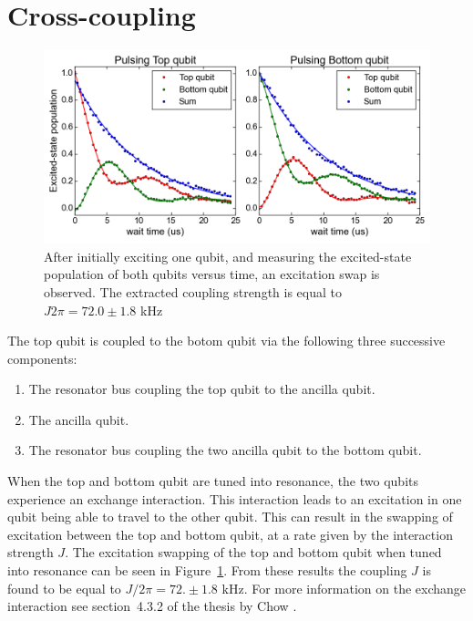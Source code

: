     \section{Cross-coupling}
      \label{sec:cross-coupling}
      \begin{figure}[tb]
        \centering
        \includegraphics[width=\linewidth]{../Figures/Exploring frequency re-use/excitation_swap.png}
        \caption{After initially exciting one qubit, and measuring the excited-state population of both qubits versus time, an excitation swap is observed. The extracted coupling strength is equal to $J2\pi=72.0 \pm 1.8$ kHz}
        \label{fig:excitation swap}
      \end{figure}

      The top qubit is coupled to the botom qubit via the following three successive components:

      \begin{enumerate}
        \item The resonator bus coupling the top qubit to the ancilla qubit.
        \item The ancilla qubit.
        \item The resonator bus coupling the two ancilla qubit to the bottom qubit.
      \end{enumerate}

      When the top and bottom qubit are tuned into resonance, the two qubits experience an exchange interaction. This interaction leads to an excitation in one qubit being able to travel to the other qubit. This can result in the swapping of excitation between the top and bottom qubit, at a rate given by the interaction strength $J$. The excitation swapping of the top and bottom qubit when tuned into resonance can be seen in Figure~\ref{fig:excitation swap}. From these results the coupling $J$ is found to be equal to $J/2\pi=72. \pm 1.8$ kHz. For more information on the exchange interaction see section~4.3.2 of the thesis by Chow \cite{Chow}.

